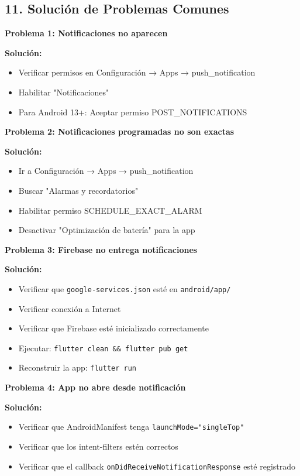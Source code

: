 \documentclass[12pt,a4paper]{article}
\begin{document}
\newpage

\subsection*{11. Solución de Problemas Comunes}

\textbf{Problema 1: Notificaciones no aparecen}

\textbf{Solución:}
\begin{itemize}
    \item Verificar permisos en Configuración → Apps → push\_notification
    \item Habilitar "Notificaciones"
    \item Para Android 13+: Aceptar permiso POST\_NOTIFICATIONS
\end{itemize}

\textbf{Problema 2: Notificaciones programadas no son exactas}

\textbf{Solución:}
\begin{itemize}
    \item Ir a Configuración → Apps → push\_notification
    \item Buscar "Alarmas y recordatorios"
    \item Habilitar permiso SCHEDULE\_EXACT\_ALARM
    \item Desactivar "Optimización de batería" para la app
\end{itemize}

\textbf{Problema 3: Firebase no entrega notificaciones}

\textbf{Solución:}
\begin{itemize}
    \item Verificar que \texttt{google-services.json} esté en \texttt{android/app/}
    \item Verificar conexión a Internet
    \item Verificar que Firebase esté inicializado correctamente
    \item Ejecutar: \texttt{flutter clean \&\& flutter pub get}
    \item Reconstruir la app: \texttt{flutter run}
\end{itemize}

\textbf{Problema 4: App no abre desde notificación}

\textbf{Solución:}
\begin{itemize}
    \item Verificar que AndroidManifest tenga \texttt{launchMode="singleTop"}
    \item Verificar que los intent-filters estén correctos
    \item Verificar que el callback \texttt{onDidReceiveNotificationResponse} esté registrado
\end{itemize}
\end{document}
